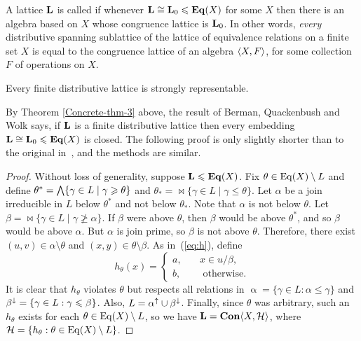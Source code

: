 

A lattice $\mathbf{L}$ is called 
if whenever $\mathbf{L} \cong \mathbf{L}_0 \leqslant \mathbf{Eq}(X)$ for some $X$ then there is an algebra based on $X$
whose congruence lattice is $\mathbf{L}_0$.  In other words, \emph{every} 
distributive spanning sublattice of the lattice of equivalence relations on a finite set
$X$ is equal to the congruence lattice of an algebra $\langle X, F\rangle$, for some
collection $F$ of operations on $X$.

  
\begin{theorem}
  Every finite distributive lattice is strongly representable.
\end{theorem}

\begin{remarks}
  By Theorem \ref{Concrete-thm-3} above, the result of Berman, Quackenbush and
  Wolk says, if $\mathbf{L}$ is a finite distributive lattice then every embedding
  $\mathbf{L}\cong \mathbf{L}_0\leqslant \mathbf{Eq}(X)$ is closed. The following proof is only slightly
  shorter than to the original in~\cite{Quack:1971}, and the methods are similar. 
\end{remarks}

\begin{proof}
  Without loss of generality, suppose $\mathbf{L}\leqslant \mathbf{Eq}(X)$. 
  Fix $\theta\in \operatorname{Eq}(X) \setminus L$ and define 
  $\theta^* = \bigwedge \{ \gamma \in L \mid \gamma \geqslant \theta \}$ and 
  $\theta_* = \Join \{ \gamma \in L \mid \gamma \leq \theta \}$.
  Let $\alpha$ be a join irreducible in $L$ below $\theta^*$ and not below
  $\theta_*$. 
  Note that $\alpha$ is not below $\theta$.
  Let $\beta = \Join \{ \gamma \in L \mid \gamma \ngeq \alpha \}$.
  If $\beta$ were above $\theta$, then $\beta$ would be above $\theta^*$,
  and so $\beta$ would be above $\alpha$. But $\alpha$ is join prime, so $\beta$ is not
  above $\theta$. Therefore, there exist $(u, v) \in \alpha \setminus \theta$
  and $(x, y) \in \theta \setminus \beta$.  
  As in~(\ref{eq:h}), define
  \begin{equation*}
    h_\theta(x) = \begin{cases}
      a,& \quad x\in u/\beta,\\
      b,& \quad \text{ otherwise.}
    \end{cases}
  \end{equation*}
  It is clear that $h_\theta$ violates $\theta$ but respects all
  relations in $\upalpha = \{\gamma \in L: \alpha \leq \gamma\}$ and 
  $\beta^{\downarrow} = \{\gamma \in L: \gamma \leqslant \beta\}$. Also,
  $L = \alpha^{\uparrow} \cup \beta^{\downarrow}$.
  Finally, since $\theta$ was arbitrary, such an $h_\theta$ exists
  for each $\theta \in \operatorname{Eq}(X) \setminus L$, so we have
  $\mathbf{L} =\mathbf{Con} \langle X, \mathcal{H}\rangle$, where
  $\mathcal{H} = \{h_\theta: \theta \in \operatorname{Eq}(X) \setminus L\}$.
\end{proof}

